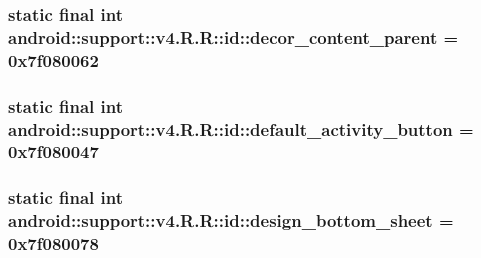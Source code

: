 \hypertarget{classandroid_1_1support_1_1v4_1_1_r_1_1id_70b0cb6a9428f0b89b7e8c51f629dad1}{
\subsubsection[{decor\_\-content\_\-parent}]{\setlength{\rightskip}{0pt plus 5cm}static final int android::support::v4.R.R::id::decor\_\-content\_\-parent = 0x7f080062}}
\label{classandroid_1_1support_1_1v4_1_1_r_1_1id_70b0cb6a9428f0b89b7e8c51f629dad1}


\hypertarget{classandroid_1_1support_1_1v4_1_1_r_1_1id_c02af64928033863ab3f87e14bc987e2}{
\subsubsection[{default\_\-activity\_\-button}]{\setlength{\rightskip}{0pt plus 5cm}static final int android::support::v4.R.R::id::default\_\-activity\_\-button = 0x7f080047}}
\label{classandroid_1_1support_1_1v4_1_1_r_1_1id_c02af64928033863ab3f87e14bc987e2}


\hypertarget{classandroid_1_1support_1_1v4_1_1_r_1_1id_002e7de49424f130d1c3707bb7c335c6}{
\subsubsection[{design\_\-bottom\_\-sheet}]{\setlength{\rightskip}{0pt plus 5cm}static final int android::support::v4.R.R::id::design\_\-bottom\_\-sheet = 0x7f080078}}
\label{classandroid_1_1support_1_1v4_1_1_r_1_1id_002e7de49424f130d1c3707bb7c335c6}


